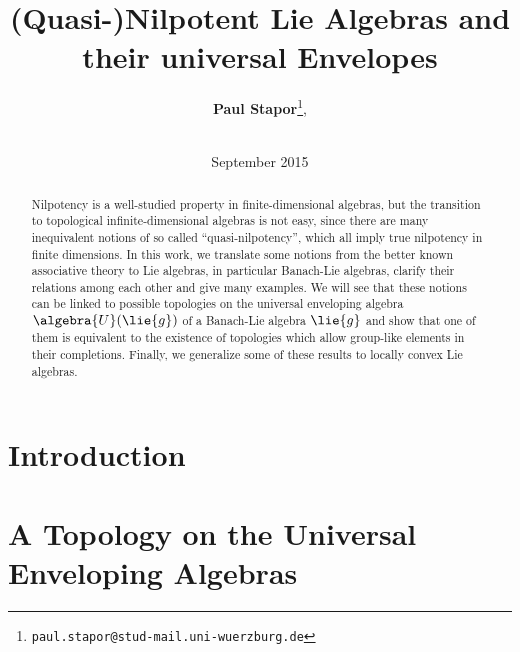 \documentclass[
11pt,                          %
english                        %
]{article}
\title{(Quasi-)Nilpotent Lie Algebras and their universal Envelopes}
\author{
  \textbf{Paul Stapor}\thanks{\texttt{paul.stapor@stud-mail.uni-wuerzburg.de}},
  \addtocounter{footnote}{2}
  \\[0.5cm]
  \chairXaddress
}
\date{September 2015}
\begin{document}
%
%

\maketitle

%
%

\begin{abstract}
    Nilpotency is a well-studied property in finite-dimensional algebras, but the 
    transition to topological infinite-dimensional algebras is not easy, since there 
    are many inequivalent notions of so called ``quasi-nilpotency'', which all imply 
    true nilpotency in finite dimensions. In this work, we translate some notions 
    from the better known associative theory to Lie algebras, in particular 
    Banach-Lie algebras, clarify their relations among each other and give many 
    examples. We will see that these notions can be linked to possible topologies on 
    the universal enveloping algebra $\algebra{U}(\lie{g})$ of a Banach-Lie algebra 
    $\lie{g}$ and show that one of them is equivalent to the existence of 
    topologies which allow group-like elements in their completions. Finally, we 
    generalize some of these results to locally convex Lie algebras.
\end{abstract}

\newpage

%
%

\tableofcontents
\newpage


%
%

\section{Introduction}
\label{sec:Introduction}



\section{A Topology on the Universal Enveloping Algebras}
\end{document}
